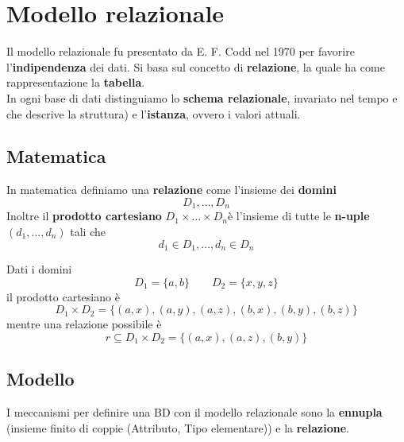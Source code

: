 \newpage
\section{Modello relazionale}
Il modello relazionale fu presentato da E. F. Codd nel 1970 per favorire l'\textbf{indipendenza} dei dati. Si basa sul concetto di \textbf{relazione}, la quale ha come rappresentazione la \textbf{tabella}.\\
In ogni base di dati distinguiamo lo \textbf{schema relazionale}, invariato nel tempo e che descrive la struttura) e l'\textbf{istanza}, ovvero i valori attuali.

\subsection{Matematica}
In matematica definiamo una \textbf{relazione} come l'insieme dei \textbf{domini}
\begin{equation*}
	D_1, \ldots, D_n
\end{equation*}
Inoltre il \textbf{prodotto cartesiano} $D_1 \times \ldots \times D_n$è l'insieme di tutte le \textbf{n-uple} $(d_1, \ldots, d_n)$ tali che 
\begin{equation*}
	d_1 \in D_1, \ldots, d_n \in D_n
\end{equation*}

\begin{example}
	Dati i domini
	\begin{equation*}
		D_1 = \{a,b\} \qquad D_2 = \{x,y,z\}
	\end{equation*}
	il prodotto cartesiano è
	\begin{equation*}
		D_1 \times D_2 = \{(a, x), (a, y), (a, z), (b, x), (b,y), (b,z)\}
	\end{equation*}
	mentre una relazione possibile è
	\begin{equation*}
		r \subseteq D_1 \times D_2 = \{(a,x),(a,z), (b,y)\}
	\end{equation*}
\end{example}

\subsection{Modello}
I meccanismi per definire una BD con il modello relazionale sono la \textbf{ennupla} (insieme finito di coppie (Attributo, Tipo elementare)) e la \textbf{relazione}.


